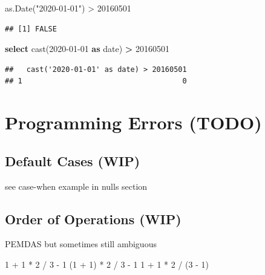 \documentclass[
]{krantz}
\makeatletter
\newenvironment{Shaded}{\begin{snugshade}}{\end{snugshade}}
\newcommand{\DataTypeTok}[1]{\textcolor[rgb]{0.27,0.27,0.27}{#1}}
\newcommand{\DecValTok}[1]{\textcolor[rgb]{0.06,0.06,0.06}{#1}}
\newcommand{\FunctionTok}[1]{\textcolor[rgb]{0,0,0}{#1}}
\newcommand{\KeywordTok}[1]{\textcolor[rgb]{0.27,0.27,0.27}{\textbf{#1}}}
\newcommand{\NormalTok}[1]{#1}
\newcommand{\OperatorTok}[1]{\textcolor[rgb]{0.43,0.43,0.43}{\textbf{#1}}}
\newcommand{\SpecialCharTok}[1]{\textcolor[rgb]{0,0,0}{#1}}
\newcommand{\StringTok}[1]{\textcolor[rgb]{0.5,0.5,0.5}{#1}}
\newenvironment{kframe}{%
\medskip{}
\setlength{\fboxsep}{.8em}
 \def\at@end@of@kframe{}%
 \ifinner\ifhmode%
  \def\at@end@of@kframe{\end{minipage}}%
  \begin{minipage}{\columnwidth}%
 \fi\fi%
 \def\FrameCommand##1{\hskip\@totalleftmargin \hskip-\fboxsep
 \colorbox{shadecolor}{##1}\hskip-\fboxsep
     \hskip-\linewidth \hskip-\@totalleftmargin \hskip\columnwidth}%
 \MakeFramed {\advance\hsize-\width
   \@totalleftmargin\z@ \linewidth\hsize
   \@setminipage}}%
 {\par\unskip\endMakeFramed%
 \at@end@of@kframe}
\renewenvironment{Shaded}{\begin{kframe}}{\end{kframe}}
\makeatother
\begin{document}
\begin{Shaded}
\begin{Highlighting}[]
\FunctionTok{as.Date}\NormalTok{(}\StringTok{"2020{-}01{-}01"}\NormalTok{) }\SpecialCharTok{\textgreater{}} \DecValTok{20160501}
\end{Highlighting}
\end{Shaded}

\begin{verbatim}
## [1] FALSE
\end{verbatim}

\begin{Shaded}
\begin{Highlighting}[]
\KeywordTok{select} \FunctionTok{cast}\NormalTok{(}\StringTok{\textquotesingle{}2020{-}01{-}01\textquotesingle{}} \KeywordTok{as} \DataTypeTok{date}\NormalTok{) }\OperatorTok{\textgreater{}} \DecValTok{20160501}
\end{Highlighting}
\end{Shaded}

\begin{verbatim}
##   cast('2020-01-01' as date) > 20160501
## 1                                     0
\end{verbatim}

\hypertarget{programming-errors-todo}{%
\section{Programming Errors (TODO)}\label{programming-errors-todo}}

\hypertarget{default-cases-wip}{%
\subsection{Default Cases (WIP)}\label{default-cases-wip}}

see case-when example in nulls section

\hypertarget{order-of-operations-wip}{%
\subsection{Order of Operations (WIP)}\label{order-of-operations-wip}}

PEMDAS but sometimes still ambiguous

\begin{Shaded}
\begin{Highlighting}[]
\DecValTok{1} \SpecialCharTok{+} \DecValTok{1}  \SpecialCharTok{*} \DecValTok{2} \SpecialCharTok{/} \DecValTok{3} \SpecialCharTok{{-}} \DecValTok{1}
\NormalTok{(}\DecValTok{1} \SpecialCharTok{+} \DecValTok{1}\NormalTok{) }\SpecialCharTok{*} \DecValTok{2} \SpecialCharTok{/} \DecValTok{3} \SpecialCharTok{{-}} \DecValTok{1}
\DecValTok{1} \SpecialCharTok{+} \DecValTok{1} \SpecialCharTok{*} \DecValTok{2} \SpecialCharTok{/}\NormalTok{ (}\DecValTok{3} \SpecialCharTok{{-}} \DecValTok{1}\NormalTok{)}
\end{Highlighting}
\end{Shaded}
\end{document}
